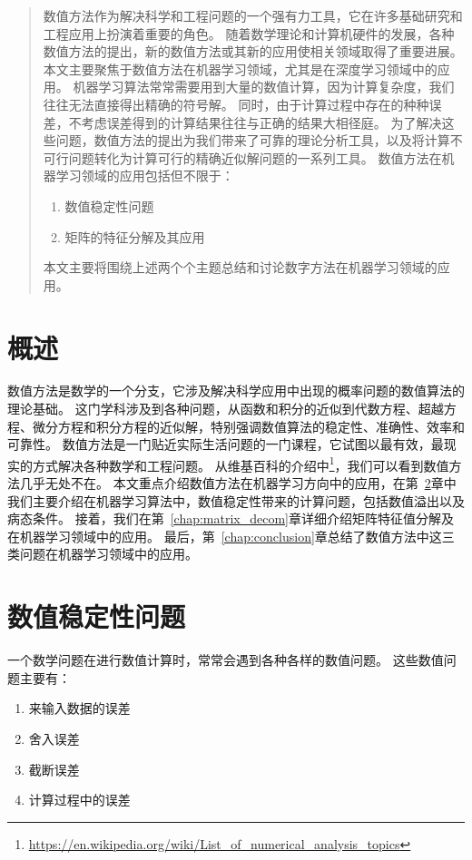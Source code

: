 \begin{abstract}
	数值方法作为解决科学和工程问题的一个强有力工具，它在许多基础研究和工程应用上扮演着重要的角色。
	随着数学理论和计算机硬件的发展，各种数值方法的提出，新的数值方法或其新的应用使相关领域取得了重要进展。
	本文主要聚焦于数值方法在机器学习领域，尤其是在深度学习领域中的应用。
	机器学习算法常常需要用到大量的数值计算，因为计算复杂度，我们往往无法直接得出精确的符号解。
	同时，由于计算过程中存在的种种误差，不考虑误差得到的计算结果往往与正确的结果大相径庭。
	为了解决这些问题，数值方法的提出为我们带来了可靠的理论分析工具，以及将计算不可行问题转化为计算可行的精确近似解问题的一系列工具。
	数值方法在机器学习领域的应用包括但不限于：
	\begin{enumerate}
		\item 数值稳定性问题
		\item 矩阵的特征分解及其应用
	\end{enumerate}
	本文主要将围绕上述两个个主题总结和讨论数字方法在机器学习领域的应用。

\end{abstract}

\chapter{概述}
\label{chap:intro}
数值方法是数学的一个分支，它涉及解决科学应用中出现的概率问题的数值算法的理论基础。
这门学科涉及到各种问题，从函数和积分的近似到代数方程、超越方程、微分方程和积分方程的近似解，特别强调数值算法的稳定性、准确性、效率和可靠性。
数值方法是一门贴近实际生活问题的一门课程，它试图以最有效，最现实的方式解决各种数学和工程问题。
从维基百科的介绍中\footnote{\url{https://en.wikipedia.org/wiki/List_of_numerical_analysis_topics}}，我们可以看到数值方法几乎无处不在。
本文重点介绍数值方法在机器学习方向中的应用，在第~\ref{chap:num_cond}章中我们主要介绍在机器学习算法中，数值稳定性带来的计算问题，包括数值溢出以及病态条件。
接着，我们在第~\ref{chap:matrix_decom}章详细介绍矩阵特征值分解及在机器学习领域中的应用。
最后，第~\ref{chap:conclusion}章总结了数值方法中这三类问题在机器学习领域中的应用。

\chapter{数值稳定性问题}
\label{chap:num_cond}
一个数学问题在进行数值计算时，常常会遇到各种各样的数值问题。
这些数值问题主要有：
\begin{enumerate}
	\item 来输入数据的误差
	\item 舍入误差
	\item 截断误差
	\item 计算过程中的误差
\end{enumerate}

